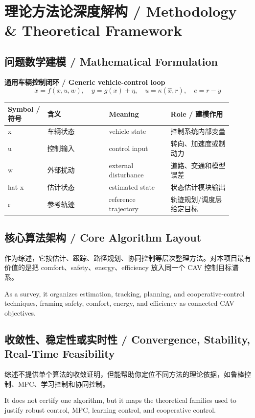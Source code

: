 \documentclass[UTF8,a4paper,11pt,fontset=fandol]{ctexart}
\begin{document}
\section{理论方法论深度解构 / Methodology \& Theoretical Framework}
\subsection{问题数学建模 / Mathematical Formulation}
\textbf{通用车辆控制闭环 / Generic vehicle-control loop}
\[
\dot x=f(x,u,w),\quad y=g(x)+\eta,\quad u=\kappa(\hat x,r),\quad e=r-y
\]
\begin{longtable}{p{0.16\linewidth}p{0.25\linewidth}p{0.25\linewidth}p{0.25\linewidth}}
\toprule
Symbol / 符号 & 含义 & Meaning & Role / 建模作用\\
\midrule
x & 车辆状态 & vehicle state & 控制系统内部变量 \\
u & 控制输入 & control input & 转向、加速度或制动力 \\
w & 外部扰动 & external disturbance & 道路、交通和模型误差 \\
hat x & 估计状态 & estimated state & 状态估计模块输出 \\
r & 参考轨迹 & reference trajectory & 轨迹规划/调度层给定目标 \\
\bottomrule
\end{longtable}

\subsection{核心算法架构 / Core Algorithm Layout}
作为综述，它按估计、跟踪、路径规划、协同控制等层次整理方法。对本项目最有价值的是把 comfort、safety、energy、efficiency 放入同一个 CAV 控制目标谱系。

As a survey, it organizes estimation, tracking, planning, and cooperative-control techniques, framing safety, comfort, energy, and efficiency as connected CAV objectives.

\subsection{收敛性、稳定性或实时性 / Convergence, Stability, Real-Time Feasibility}
综述不提供单个算法的收敛证明，但能帮助你定位不同方法的理论依据，如鲁棒控制、MPC、学习控制和协同控制。

It does not certify one algorithm, but it maps the theoretical families used to justify robust control, MPC, learning control, and cooperative control.
\end{document}
